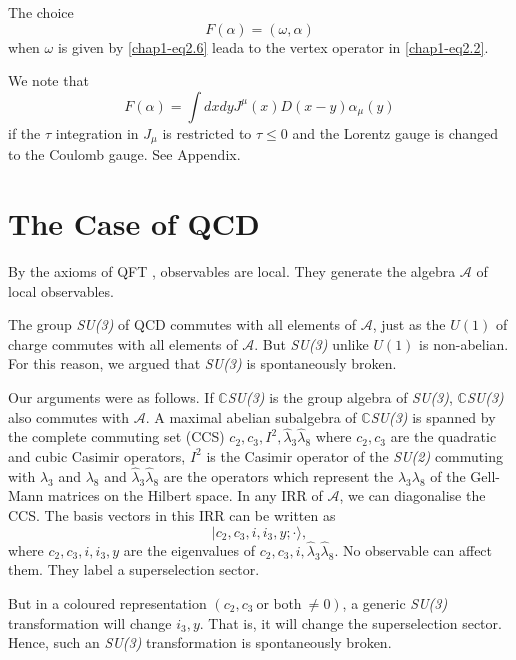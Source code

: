 The choice
\begin{equation}
F(\alpha) = (\omega, \alpha) \label{chap1-eq2.33}
\end{equation}
when $\omega$ is given by \eqref{chap1-eq2.6} leada to the vertex operator in \eqref{chap1-eq2.2}.

We note that
\begin{equation}
F(\alpha) = \int dx dy {J}^\mu (x) {D}(x-y) \alpha_\mu (y) \label{chap1-eq2.34}
\end{equation}
if the $\tau$ integration in ${J}_\mu$ is restricted to $\tau \leq 0$ and the Lorentz gauge is changed to the Coulomb gauge. See Appendix.

\section{The Case of QCD}\label{chap1-sec3}

By the axioms of QFT \cite{key9}, observables are local. They generate the algebra $\mathcal{A}$ of local observables.

The group \textit{SU(3)} of QCD commutes with all elements of $\mathcal{A}$, just as the $U(1)$ of charge commutes with all elements of  $\mathcal{A}$. But \textit{SU(3)} unlike $U(1)$ is non-abelian. For this reason, we argued \cite{key1, key4} that \textit{SU(3)} is spontaneously broken.

Our arguments were as follows. If $\mathbb{C}$\textit{SU(3)} is the group algebra of \textit{SU(3)}, $\mathbb{C}$\textit{SU(3)} also commutes with $\mathcal{A}$. A maximal abelian subalgebra of $\mathbb{C}$\textit{SU(3)} is spanned by the complete commuting set (CCS) $c_2, c_3, I^{2}, \hat{\lambda}_3 \hat{\lambda}_8$ where $c_2, c_3$ are the quadratic and cubic Casimir operators, $I^{2}$ is the Casimir operator of the \textit{SU(2)} commuting with $\lambda_{3}$ and $\lambda_{8}$ and  $\hat{\lambda}_3 \hat{\lambda}_8$ are the operators which represent the ${\lambda}_3 {\lambda}_8$ of the Gell-Mann matrices on the Hilbert space. In any IRR of $\mathcal{A}$, we can diagonalise the CCS. The basis vectors in this IRR can be written as
\begin{equation}
  |c_2, c_3, i, i_3, y;\cdot \rangle,\label{chap1-eq3.1}
\end{equation}
where $c_2, c_3, i, i_3, y$ are the eigenvalues of $c_2, c_3, i, \hat{\lambda}_3 \hat{\lambda}_8$. No observable can affect them. They label a superselection sector.

But in a coloured representation $(c_2, c_3 ~\text{or both}~\neq 0)$, a generic \textit{SU(3)} transformation will change $i_3, y$. That is, it will change the superselection sector. Hence, such an \textit{SU(3)} transformation is spontaneously broken.

